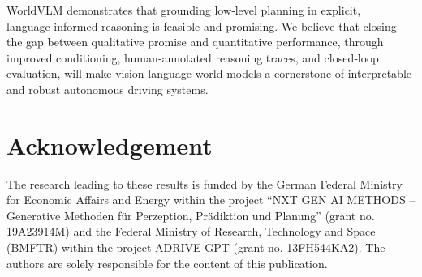 \documentclass[letterpaper, 10 pt, conference]{ieeeconf}
\begin{document}
WorldVLM demonstrates that grounding low‑level planning in explicit, language‑informed reasoning is feasible and promising. We believe that closing the gap between qualitative promise and quantitative performance, through improved conditioning, human‑annotated reasoning traces, and closed‑loop evaluation, will make vision‑language world models a cornerstone of interpretable and robust autonomous driving systems.

\section{Acknowledgement}
The research leading to these results is funded by the
German Federal Ministry for Economic Affairs and Energy within the project “NXT GEN AI METHODS – Generative Methoden für Perzeption, Prädiktion und Planung”
(grant no. 19A23914M) and the Federal Ministry of Research, Technology and Space (BMFTR) within
the project ADRIVE-GPT (grant no. 13FH544KA2). The authors are solely
responsible for the content of this publication.

\balance


\end{document}

